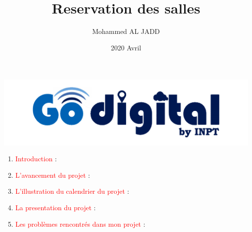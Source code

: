 \documentclass{article}
\title{Reservation des salles}
\author{Mohammed AL JADD}
\date{2020 Avril}
\begin{document}
\maketitle

    



\includegraphics[width=\textwidth]{img/Go.png}

\begin{enumerate}
    
     \item  \textcolor{red}{\huge Introduction} : 
     
   
   \item \textcolor{red}{\huge L'avancement du projet} :
   
   
   
   \item \textcolor{red}{\huge L'illustration du calendrier du projet} :  
   
   \item \textcolor{red}{\huge La presentation du projet} :  
   \vspace{1cm}
   

   \item \textcolor{red}{\huge Les problèmes rencontrés dans mon projet} :
   
  
\end{enumerate}
\end{document}
